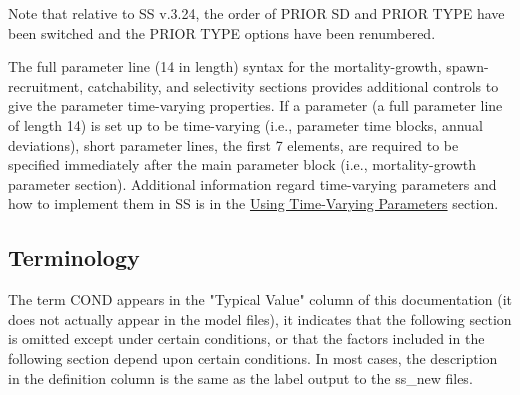 Note that relative to SS v.3.24,  the order of PRIOR SD and PRIOR TYPE have been switched and the PRIOR TYPE options have been renumbered.

The full parameter line (14 in length) syntax for the mortality-growth, spawn-recruitment, catchability, and selectivity sections provides additional controls to give the parameter time-varying properties.  If a parameter (a full parameter line of length 14) is set up to be time-varying (i.e., parameter time blocks, annual deviations), short parameter lines, the first 7 elements, are required to be specified immediately after the main parameter block (i.e., mortality-growth parameter section).  Additional information regard time-varying parameters and how to implement them in SS is in the \hyperlink{TVpara}{Using Time-Varying Parameters} section.


\subsection{Terminology}
The term COND appears in the "Typical Value" column of this documentation (it does not actually appear in the model files), it indicates that the following section is omitted except under certain conditions, or that the factors included in the following section depend upon certain conditions. In most cases, the description in the definition column is the same as the label output to the ss\_new files.

